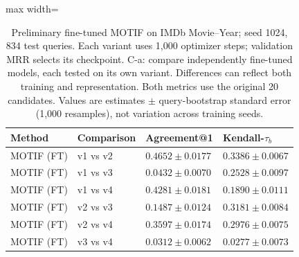 \begin{table}[htbp]
\centering
\small
\renewcommand{\arraystretch}{1.15}
\setlength{\tabcolsep}{5pt}
\begin{adjustbox}{max width=\linewidth}
\begin{tabular}{|l|l|l|l|}
\hline
\textbf{Method} & \textbf{Comparison} & \textbf{Agreement@1} & \textbf{Kendall-$\tau_b$} \\
\hline
MOTIF (FT) & v1 vs v2 & $0.4652 \pm 0.0177$ & $0.3386 \pm 0.0067$ \\
\hline
MOTIF (FT) & v1 vs v3 & $0.0432 \pm 0.0070$ & $0.2528 \pm 0.0097$ \\
\hline
MOTIF (FT) & v1 vs v4 & $0.4281 \pm 0.0181$ & $0.1890 \pm 0.0111$ \\
\hline
MOTIF (FT) & v2 vs v3 & $0.1487 \pm 0.0124$ & $0.3181 \pm 0.0084$ \\
\hline
MOTIF (FT) & v2 vs v4 & $0.3597 \pm 0.0174$ & $0.2976 \pm 0.0075$ \\
\hline
MOTIF (FT) & v3 vs v4 & $0.0312 \pm 0.0062$ & $0.0277 \pm 0.0073$ \\
\hline
\end{tabular}
\end{adjustbox}
\caption{Preliminary fine-tuned MOTIF on IMDb Movie--Year; seed 1024, 834 test queries. Each variant uses 1,000 optimizer steps; validation MRR selects its checkpoint. C-a: compare independently fine-tuned models, each tested on its own variant. Differences can reflect both training and representation. Both metrics use the original 20 candidates. Values are estimates $\pm$ query-bootstrap standard error (1,000 resamples), not variation across training seeds.}
\label{tab:motif-imdb-movie-year-matrix-per-variant-comparisons}
\end{table}
